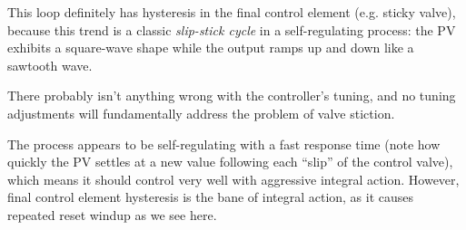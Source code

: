 \vskip 10pt

This loop definitely has hysteresis in the final control element (e.g. sticky valve), because this trend is a classic {\it slip-stick cycle} in a self-regulating process: the PV exhibits a square-wave shape while the output ramps up and down like a sawtooth wave.

\vskip 10pt

There probably isn't anything wrong with the controller's tuning, and no tuning adjustments will fundamentally address the problem of valve stiction.  

\vskip 10pt

The process appears to be self-regulating with a fast response time (note how quickly the PV settles at a new value following each ``slip'' of the control valve), which means it should control very well with aggressive integral action.  However, final control element hysteresis is the bane of integral action, as it causes repeated reset windup as we see here.











